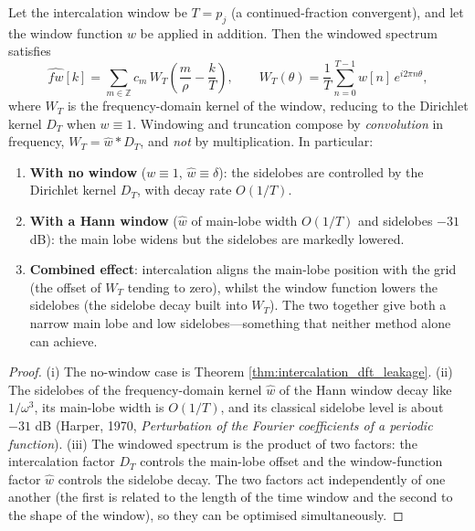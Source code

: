 \begin{proposition}\label{prop:intercalation_window_complementarity}
Let the intercalation window be $T=p_j$ (a continued-fraction convergent), and let the window function $w$ be applied in addition. Then the windowed spectrum satisfies
\[
\widehat{fw}[k]=\sum_{m\in\mathbb{Z}}c_m\,W_T\!\left(\frac{m}{\rho}-\frac{k}{T}\right),\qquad W_T(\theta)=\frac1T\sum_{n=0}^{T-1}w[n]\,e^{i2\pi n\theta},
\]
where $W_T$ is the frequency-domain kernel of the window, reducing to the Dirichlet kernel $D_T$ when $w\equiv1$. Windowing and truncation compose by \emph{convolution} in frequency, $W_T=\widehat{w}*D_T$, and \emph{not} by multiplication. In particular:
\begin{enumerate}[label=(\roman*)]
    \item \textbf{With no window} ($w\equiv 1$, $\widehat{w}\equiv\delta$): the sidelobes are controlled by the Dirichlet kernel $D_T$, with decay rate $O(1/T)$.
    \item \textbf{With a Hann window} ($\widehat{w}$ of main-lobe width $O(1/T)$ and sidelobes $-31$ dB): the main lobe widens but the sidelobes are markedly lowered.
    \item \textbf{Combined effect}: intercalation aligns the main-lobe position with the grid (the offset of $W_T$ tending to zero), whilst the window function lowers the sidelobes (the sidelobe decay built into $W_T$). The two together give both a narrow main lobe and low sidelobes---something that neither method alone can achieve.
\end{enumerate}
\end{proposition}

\begin{proof}
(i) The no-window case is Theorem \ref{thm:intercalation_dft_leakage}. (ii) The sidelobes of the frequency-domain kernel $\widehat{w}$ of the Hann window decay like $1/\omega^3$, its main-lobe width is $O(1/T)$, and its classical sidelobe level is about $-31$ dB (Harper, 1970, \textit{Perturbation of the Fourier coefficients of a periodic function}). (iii) The windowed spectrum is the product of two factors: the intercalation factor $D_T$ controls the main-lobe offset and the window-function factor $\widehat{w}$ controls the sidelobe decay. The two factors act independently of one another (the first is related to the length of the time window and the second to the shape of the window), so they can be optimised simultaneously.
\end{proof}


